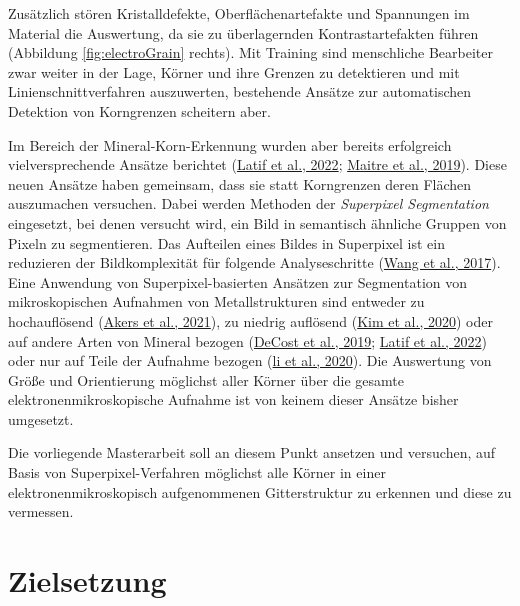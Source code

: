 \documentclass[
  12pt,
]{book}
\begin{document}
Zusätzlich stören Kristalldefekte, Oberflächenartefakte und Spannungen im Material die Auswertung, da sie zu überlagernden Kontrastartefakten führen (Abbildung \ref{fig:electroGrain} rechts).
Mit Training sind menschliche Bearbeiter zwar weiter in der Lage, Körner und ihre Grenzen zu detektieren und mit Linienschnittverfahren auszuwerten, bestehende Ansätze zur automatischen Detektion von Korngrenzen scheitern aber.

Im Bereich der Mineral-Korn-Erkennung wurden aber bereits erfolgreich vielversprechende Ansätze berichtet (\protect\hyperlink{ref-latifDeepLearningBasedAutomaticMineral2022}{Latif et al., 2022}; \protect\hyperlink{ref-maitreMineralGrainsRecognition2019}{Maitre et al., 2019}). Diese neuen Ansätze haben gemeinsam, dass sie statt Korngrenzen deren Flächen auszumachen versuchen. Dabei werden Methoden der \emph{Superpixel Segmentation} eingesetzt, bei denen versucht wird, ein Bild in semantisch ähnliche Gruppen von Pixeln zu segmentieren. Das Aufteilen eines Bildes in Superpixel ist ein reduzieren der Bildkomplexität für folgende Analyseschritte (\protect\hyperlink{ref-wangSuperpixelSegmentationBenchmark2017}{Wang et al., 2017}). Eine Anwendung von Superpixel-basierten Ansätzen zur Segmentation von mikroskopischen Aufnahmen von Metallstrukturen sind entweder zu hochauflösend (\protect\hyperlink{ref-akersRapidFlexibleSegmentation2021}{Akers et al., 2021}), zu niedrig auflösend (\protect\hyperlink{ref-kimUnsupervisedMicrostructureSegmentation2020}{Kim et al., 2020}) oder auf andere Arten von Mineral bezogen (\protect\hyperlink{ref-decostHighThroughputQuantitative2019}{DeCost et al., 2019}; \protect\hyperlink{ref-latifDeepLearningBasedAutomaticMineral2022}{Latif et al., 2022}) oder nur auf Teile der Aufnahme bezogen (\protect\hyperlink{ref-liMetallographicImageSegmentation2020}{li et al., 2020}).
Die Auswertung von Größe und Orientierung möglichst aller Körner über die gesamte elektronenmikroskopische Aufnahme ist von keinem dieser Ansätze bisher umgesetzt.

Die vorliegende Masterarbeit soll an diesem Punkt ansetzen und versuchen, auf Basis von Superpixel-Verfahren möglichst alle Körner in einer elektronenmikroskopisch aufgenommenen Gitterstruktur zu erkennen und diese zu vermessen.

\hypertarget{zielsetzung}{%
\section{Zielsetzung}\label{zielsetzung}}
\end{document}
